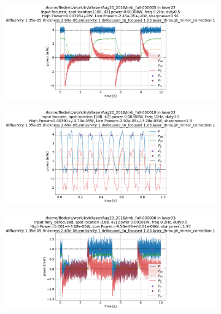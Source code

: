 \begin{figure}
     \centering
     \begin{subfigure}{0.6\linewidth}
        \centering
        \includegraphics[width=\textwidth,trim={270 0 320 115},clip]{Chapters/chapter2/figs/example_for_paper_22.png}
        \vspace*{-5mm}
        {\color{white}\caption{\phantom{ }}\label{fig:example_for_paper_15}}
     \end{subfigure}
     \begin{subfigure}{0.6\linewidth}
        \centering
        \includegraphics[width=\textwidth,trim={270 0 320 115},clip]{Chapters/chapter2/figs/example_for_paper_23.png}
        \vspace*{-5mm}
        {\color{white}\caption{\phantom{ }}\label{fig:example_for_paper_14}}
     \end{subfigure}
     \begin{subfigure}{0.62\linewidth}
        \centering
        \includegraphics[width=\textwidth,trim={250 0 320 115},clip]{Chapters/chapter2/figs/example_for_paper_21.png}

\end{subfigure}
\end{figure}

